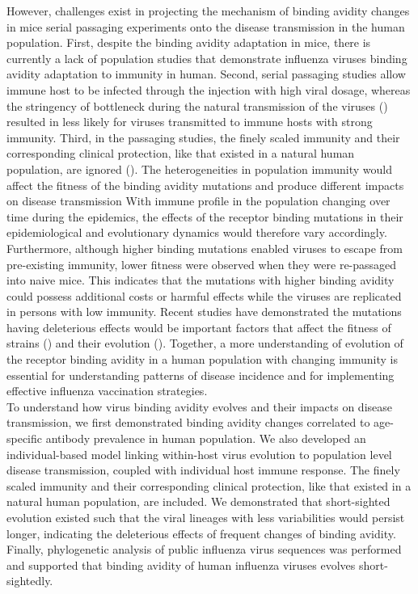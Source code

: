 \documentclass[12pt,a4paper]{article}
\begin{document}
However, challenges exist in projecting the mechanism of binding avidity changes in mice serial passaging experiments onto the disease transmission in the human population. First, despite the binding avidity adaptation in mice, there is currently a lack of population studies that demonstrate influenza viruses binding avidity adaptation to immunity in human. Second, serial passaging studies allow immune host to be infected through the injection with high viral dosage, whereas  the stringency of bottleneck during the natural transmission of the viruses (\cite{Varble2014}) resulted in less likely for viruses transmitted to immune hosts with strong immunity. Third, in the passaging studies, the finely scaled immunity and their corresponding clinical protection, like that existed in a natural human population, are ignored (\cite{Yuan2016}). The heterogeneities in population immunity would affect the fitness of the binding avidity mutations and produce different impacts on disease transmission With immune profile in the population changing over time during the epidemics, the effects of the receptor binding mutations in their epidemiological and evolutionary dynamics would therefore vary accordingly. Furthermore, although higher binding mutations enabled viruses to escape from pre-existing immunity, lower fitness were observed when they were re-passaged into naive mice. This indicates that the mutations with higher binding avidity could possess additional costs or harmful effects while the viruses are replicated in persons with low immunity. Recent studies have demonstrated the mutations having deleterious effects would be important factors that affect the fitness of strains (\cite{Luksza2014}) and their evolution (\cite{Koelle2015}). Together, a more understanding of evolution of the receptor binding avidity in a human population with changing immunity is essential for understanding patterns of disease incidence and for implementing effective influenza vaccination strategies. \\
To understand how virus binding avidity evolves and their impacts on disease transmission, we first demonstrated  binding avidity changes correlated to age-specific antibody prevalence in human population. We also developed an individual-based model linking within-host virus evolution to population level disease transmission, coupled with individual host immune response. The finely scaled immunity and their corresponding clinical protection, like that existed in a natural human population, are included. We demonstrated that short-sighted evolution existed such that the viral lineages with less variabilities would persist longer, indicating the deleterious effects of frequent changes of binding avidity.  Finally, phylogenetic analysis of public influenza virus sequences was performed and supported that binding avidity of human influenza viruses evolves short-sightedly. \\
\end{document}

